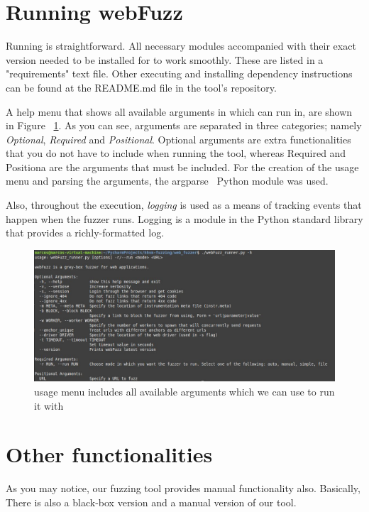 \section{Running webFuzz}
Running \pname{} is straightforward. All necessary modules accompanied with their exact version needed to be installed for \pname{} to work smoothly. These are listed in a "requirements" text file. Other executing and installing dependency instructions can be found at the README.md file in the tool's repository.

A help menu that shows all available arguments in which \pname{} can run in, are shown in Figure ~\ref{fig:argparser_menu}. As you can see, arguments are separated in three categories; namely \emph{Optional}, \emph{Required} and \emph{Positional}. Optional arguments are extra functionalities that you do not have to include when running the tool, whereas Required and Positiona are the arguments that must be included. For the creation of the usage menu and parsing the arguments, the argparse~\cite{argparse} Python module was used.

Also, throughout the execution, \emph{logging} is used as a means of tracking events that happen when the fuzzer runs. Logging is a module in the Python standard library that provides a richly-formatted log.

\begin{figure}[ht]
 \centering
 \captionsetup{justification=centering}
 \includegraphics[width=\linewidth]{figures/argparser_menu.jpg}
 \caption[\pname{} usage menu]{\pname{} usage menu includes all available arguments which we can use to run it with}
 \label{fig:argparser_menu}
\end{figure}

\section{Other functionalities}
As you may notice, our fuzzing tool provides manual functionality also. Basically, 
There is also a black-box version and a manual version of our tool.